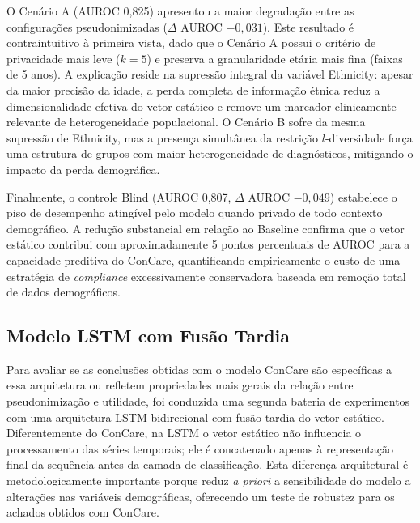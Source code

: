 O Cenário A (AUROC 0,825) apresentou a maior degradação entre as configurações pseudonimizadas ($\Delta$ AUROC $-0{,}031$). Este resultado é contraintuitivo à primeira vista, dado que o Cenário A possui o critério de privacidade mais leve ($k=5$) e preserva a granularidade etária mais fina (faixas de 5 anos). A explicação reside na supressão integral da variável Ethnicity: apesar da maior precisão da idade, a perda completa de informação étnica reduz a dimensionalidade efetiva do vetor estático e remove um marcador clinicamente relevante de heterogeneidade populacional. O Cenário B sofre da mesma supressão de Ethnicity, mas a presença simultânea da restrição $l$-diversidade força uma estrutura de grupos com maior heterogeneidade de diagnósticos, mitigando o impacto da perda demográfica.

Finalmente, o controle Blind (AUROC 0,807, $\Delta$ AUROC $-0{,}049$) estabelece o piso de desempenho atingível pelo modelo quando privado de todo contexto demográfico. A redução substancial em relação ao Baseline confirma que o vetor estático contribui com aproximadamente 5 pontos percentuais de AUROC para a capacidade preditiva do ConCare, quantificando empiricamente o custo de uma estratégia de \textit{compliance} excessivamente conservadora baseada em remoção total de dados demográficos.

\subsection{Modelo LSTM com Fusão Tardia}
\label{sec:resultados-lstm}

Para avaliar se as conclusões obtidas com o modelo ConCare são específicas a essa arquitetura ou refletem propriedades mais gerais da relação entre pseudonimização e utilidade, foi conduzida uma segunda bateria de experimentos com uma arquitetura LSTM bidirecional com fusão tardia do vetor estático. Diferentemente do ConCare, na LSTM o vetor estático não influencia o processamento das séries temporais; ele é concatenado apenas à representação final da sequência antes da camada de classificação. Esta diferença arquitetural é metodologicamente importante porque reduz \textit{a priori} a sensibilidade do modelo a alterações nas variáveis demográficas, oferecendo um teste de robustez para os achados obtidos com ConCare.

